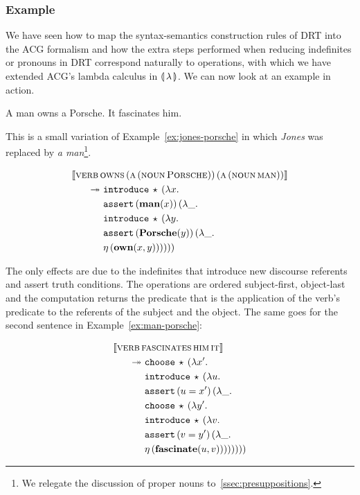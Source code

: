 \subsubsection{Example}

We have seen how to map the syntax-semantics construction rules of DRT into
the ACG formalism and how the extra steps performed when reducing
indefinites or pronouns in DRT correspond naturally to operations, with
which we have extended ACG's lambda calculus in $\llparenthesis \, \lambda \, \rrparenthesis$. We can
now look at an example in action.

\begin{exe}
  \ex \label{ex:man-porsche} A man owns a Porsche. It fascinates him.
\end{exe}

This is a small variation of Example~\ref{ex:jones-porsche} in which
\emph{Jones} was replaced by \emph{a man}\footnote{We relegate the
  discussion of proper nouns to~\ref{ssec:presuppositions}.}.

\begin{align*}
  \llbracket \textsc{verb}\,&\textsc{owns}\,(\textsc{a}\,(\textsc{noun}\,\textsc{Porsche}))\,(\textsc{a}\,(\textsc{noun}\,\textsc{man})) \rrbracket \\
  \twoheadrightarrow &\ \mathtt{introduce}\,\star\,(\lambda x.\,  \\
       &\ \mathtt{assert}\,(\textbf{man}(x))\,(\lambda \_.\,  \\
       &\ \mathtt{introduce}\,\star\,(\lambda y.\,  \\
       &\ \mathtt{assert}\,(\textbf{Porsche}(y))\,(\lambda \_.\,  \\
       &\ \eta\,(\textbf{own}(x, y))))))
\end{align*}

The only effects are due to the indefinites that introduce new discourse
referents and assert truth conditions. The operations are ordered
subject-first, object-last and the computation returns the predicate that
is the application of the verb's predicate to the referents of the subject
and the object. The same goes for the second sentence in
Example~\ref{ex:man-porsche}:

\begin{align*}
  \llbracket \textsc{verb}\,&\textsc{fascinates}\,\textsc{him}\,\textsc{it} \rrbracket \\
  \twoheadrightarrow &\ \mathtt{choose}\,\star\,(\lambda x'.\,  \\
       &\ \mathtt{introduce}\,\star\,(\lambda u.\,  \\
       &\ \mathtt{assert}\,(u = x')\,(\lambda \_.\,  \\
       &\ \mathtt{choose}\,\star\,(\lambda y'.\,  \\
       &\ \mathtt{introduce}\,\star\,(\lambda v.\,  \\
       &\ \mathtt{assert}\,(v = y')\,(\lambda \_.\,  \\
       &\ \eta\,(\textbf{fascinate}(u, v))))))))
\end{align*}

